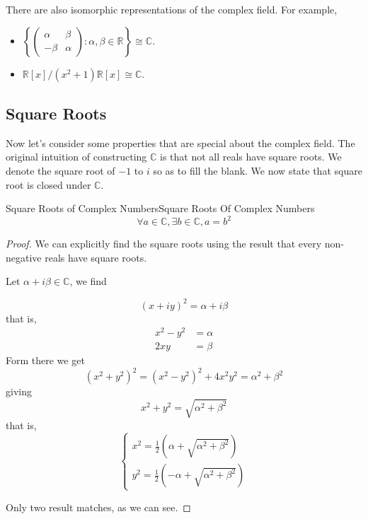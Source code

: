 \documentclass[../main.tex]{subfiles}
\begin{document}
There are also isomorphic representations of the complex field. For example, 
\begin{itemize}
\item $\displaystyle \left\{ 
\begin{pmatrix}
	\alpha&\beta\\
	-\beta&\alpha
\end{pmatrix}
: \alpha,\beta\in \mathbb{R}\right\} \cong \mathbb{C}$.
\item $\mathbb{R}[x] / \left(x^2+1\right)\mathbb{R}[x] \cong \mathbb{C}$.
\end{itemize}

\subsection{Square Roots}
Now let's consider some properties that are special about the complex field. The original intuition of constructing $\mathbb{C}$ is that not all reals have square roots. We denote the square root of $-1$ to $i$ so  as to fill the blank. We now state that square root is closed under $\mathbb{C}$.
\begin{theorem}{Square Roots of Complex Numbers}{Square Roots Of Complex Numbers}
\begin{equation*}
\forall a \in \mathbb{C}, \exists b \in \mathbb{C},a=b ^2
\end{equation*}
\end{theorem}
\begin{proof}
We can explicitly find the square roots using the result that every non-negative reals have square roots.

Let $\alpha+i \beta\in \mathbb{C}$, we find 

\begin{equation*}
\left(x+iy\right)^2 = \alpha+i \beta
\end{equation*}
that is,
\begin{equation*}
\begin{aligned}
	x^2-y^2 &= \alpha\\
	2xy &= \beta
\end{aligned}
\end{equation*}
Form there we get
\begin{equation*}
\left(x^2+y^2\right)^2 = \left(x^2-y^2\right)^2 + 4x^2y^2 = \alpha^2 + \beta^2
\end{equation*}
giving
\begin{equation*}
x^2+y^2 = \sqrt{\alpha^2+\beta^2}
\end{equation*}
that is,
\begin{equation*}
\begin{cases}
x^2=\frac{1}{2}\left(\alpha + \sqrt{\alpha^2+\beta^2}\right)\\
y^2=\frac{1}{2}\left(-\alpha + \sqrt{\alpha^2+\beta^2}\right)
\end{cases}
\end{equation*}

Only two result matches, as we can see.

\end{proof} 
\end{document}
